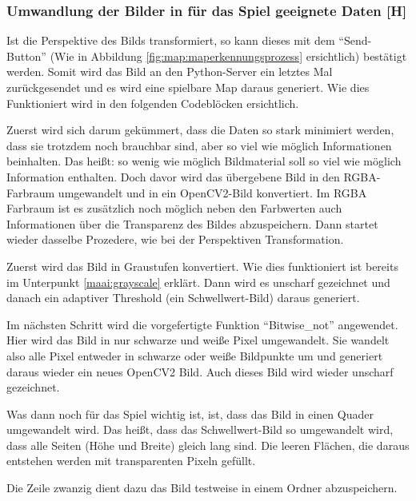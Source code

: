 \subsubsection{Umwandlung der Bilder in für das Spiel geeignete Daten [H]}\label{maai:udbifdsbd:head}
Ist die Perspektive des Bilds transformiert, so kann dieses mit dem ``Send-Button'' (Wie in Abbildung \ref{fig:map:maperkennungsprozess} ersichtlich) bestätigt werden.
Somit wird das Bild an den Python-Server ein letztes Mal zurückgesendet und es wird eine spielbare Map daraus generiert.
Wie dies Funktioniert wird in den folgenden Codeblöcken ersichtlich.

Zuerst wird sich darum gekümmert, dass die Daten so stark minimiert werden, dass sie trotzdem noch brauchbar sind, aber so viel wie möglich Informationen beinhalten. Das heißt: so wenig wie möglich Bildmaterial soll so viel wie möglich Information enthalten. Doch davor wird das übergebene Bild in den RGBA-Farbraum umgewandelt und in ein OpenCV2-Bild konvertiert. Im RGBA Farbraum ist es zusätzlich noch möglich neben den Farbwerten auch Informationen über die Transparenz des Bildes abzuspeichern. Dann startet wieder dasselbe Prozedere, wie bei der Perspektiven Transformation.

Zuerst wird das Bild in Graustufen konvertiert. Wie dies funktioniert ist bereits im Unterpunkt \ref{maai:grayscale} erklärt. Dann wird es unscharf gezeichnet und danach ein adaptiver Threshold (ein Schwellwert-Bild) daraus generiert.

Im nächsten Schritt wird die vorgefertigte Funktion ``Bitwise\_not'' angewendet. Hier wird das Bild in nur schwarze und weiße Pixel umgewandelt. Sie wandelt also alle Pixel entweder in schwarze oder weiße Bildpunkte um und generiert daraus wieder ein neues OpenCV2 Bild. Auch dieses Bild wird wieder unscharf gezeichnet.

Was dann noch für das Spiel wichtig ist, ist, dass das Bild in einen Quader umgewandelt wird. Das heißt, dass das Schwellwert-Bild so umgewandelt wird, dass alle Seiten (Höhe und Breite) gleich lang sind. Die leeren Flächen, die daraus entstehen werden mit transparenten Pixeln gefüllt.

Die Zeile zwanzig dient dazu das Bild testweise in einem Ordner abzuspeichern.

